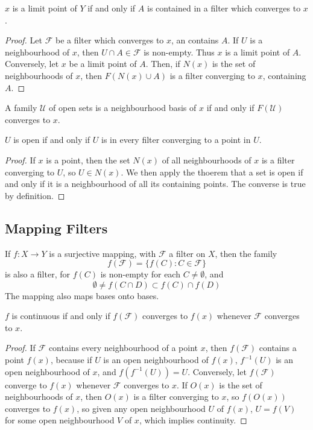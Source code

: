 \begin{example}
\begin{lemma}
    $x$ is a limit point of $Y$ if and only if $A$ is contained in a filter which converges to $x$.
\end{lemma}
\begin{proof}
    Let $\mathcal{F}$ be a filter which converges to $x$, an contains $A$. If $U$ is a neighbourhood of $x$, then $U \cap A \in \mathcal{F}$ is non-empty. Thus $x$ is a limit point of $A$. Conversely, let $x$ be a limit point of $A$. Then, if $N(x)$ is the set of neighbourhoods of $x$, then $F(N(x) \cup A)$ is a filter converging to $x$, containing $A$.
\end{proof}

\begin{example}
    A family $\mathcal{U}$ of open sets is a neighbourhood basis of $x$ if and only if $F(\mathcal{U})$ converges to $x$.
\end{example}

\begin{theorem}
    $U$ is open if and only if $U$ is in every filter converging to a point in $U$.
\end{theorem}
\begin{proof}
    If $x$ is a point, then the set $N(x)$ of all neighbourhoods of $x$ is a filter converging to $U$, so $U \in N(x)$. We then apply the thoerem that a set is open if and only if it is a neighbourhood of all its containing points. The converse is true by definition.
\end{proof}

\subsection{Mapping Filters}

If $f: X \to Y$ is a surjective mapping, with $\mathcal{F}$ a filter on $X$, then the family
%
\[ f(\mathcal{F}) = \{ f(C) : C \in \mathcal{F} \} \]
%
is also a filter, for $f(C)$ is non-empty for each $C \neq \emptyset$, and
%
\[ \emptyset \neq f(C \cap D) \subset f(C) \cap f(D) \]
%
The mapping also maps bases onto bases.

\begin{theorem}
    $f$ is continuous if and only if $f(\mathcal{F})$ converges to $f(x)$ whenever $\mathcal{F}$ converges to $x$.
\end{theorem}
\begin{proof}
    If $\mathcal{F}$ contains every neighbourhood of a point $x$, then $f(\mathcal{F})$ contains a point $f(x)$, because if $U$ is an open neighbourhood of $f(x)$, $f^{-1}(U)$ is an open neighbourhood of $x$, and $f(f^{-1}(U)) = U$. Conversely, let $f(\mathcal{F})$ converge to $f(x)$ whenever $\mathcal{F}$ converges to $x$. If $O(x)$ is the set of neighbourhoods of $x$, then $O(x)$ is a filter converging to $x$, so $f(O(x))$ converges to $f(x)$, so given any open neighbourhood $U$ of $f(x)$, $U = f(V)$ for some open neighbourhood $V$ of $x$, which implies continuity.
\end{proof}


\end{example}
